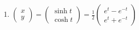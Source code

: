 \begin{ueb}
\begin{enumerate}
\begin{enumerate}

                  \item \(\begin{pmatrix}
                            x \\
                            y
                        \end{pmatrix} = \begin{pmatrix}
                            \sinh t \\
                            \cosh t
                        \end{pmatrix} = \frac{1}{2}\begin{pmatrix}
                            e^t - e^{-t} \\
                            e^t + e^{-t}
                        \end{pmatrix}\)
              \end{enumerate}
    \end{enumerate}

\end{ueb}

